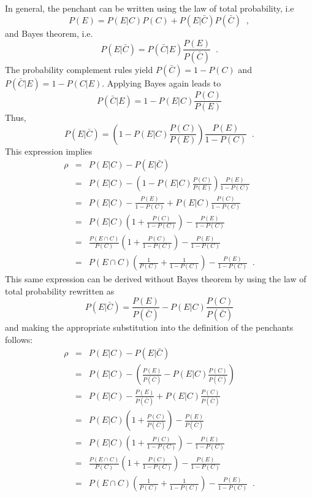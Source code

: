 \documentclass[a4paper,11pt]{article}
\begin{document}
In general, the penchant can be written using the law of total probability, i.e
$$
P(E) = P(E|C)P(C) + P(E|\bar{C})P(\bar{C})\;\;,
$$
and Bayes theorem, i.e.\ 
$$
P(E|\bar{C}) = P(\bar{C}|E)\frac{P(E)}{P(\bar{C})}\;\;.
$$
The probability complement rules yield $P(\bar{C}) = 1-P(C)$ and $P(\bar{C}|E) = 1-P(C|E)$.  Applying Bayes again leads to
$$
P(\bar{C}|E) = 1-P(E|C)\frac{P(C)}{P(E)}
$$
Thus,
$$
P(E|\bar{C}) = \left(1-P(E|C)\frac{P(C)}{P(E)}\right)\frac{P(E)}{1-P(C)}\;\;.
$$
This expression implies
\begin{eqnarray}
\rho &=& P(E|C)-P(E|\bar{C})\\
&=& P(E|C)-\left(1-P(E|C)\frac{P(C)}{P(E)}\right)\frac{P(E)}{1-P(C)}\\
&=& P(E|C)-\frac{P(E)}{1-P(C)}+P(E|C)\frac{P(C)}{1-P(C)}\\
&=& P(E|C)\left(1+\frac{P(C)}{1-P(C)}\right)-\frac{P(E)}{1-P(C)}\\
&=& \frac{P(E\cap C)}{P(C)}\left(1+\frac{P(C)}{1-P(C)}\right)-\frac{P(E)}{1-P(C)}\\
&=& P(E\cap C)\left(\frac{1}{P(C)}+\frac{1}{1-P(C)}\right)-\frac{P(E)}{1-P(C)}\;\;.
\end{eqnarray}
This same expression can be derived without Bayes theorem by using the law of total probability rewritten as
$$
P(E|\bar{C}) = \frac{P(E)}{P(\bar{C})} - P(E|C)\frac{P(C)}{P(\bar{C})}
$$
and making the appropriate substitution into the definition of the penchants follows:
\begin{eqnarray}
\rho &=& P(E|C)-P(E|\bar{C})\\
&=& P(E|C)-\left(\frac{P(E)}{P(\bar{C})} - P(E|C)\frac{P(C)}{P(\bar{C})}\right)\\
&=& P(E|C)-\frac{P(E)}{P(\bar{C})} + P(E|C)\frac{P(C)}{P(\bar{C})}\\
&=& P(E|C)\left(1+\frac{P(C)}{P(\bar{C})}\right)-\frac{P(E)}{P(\bar{C})}\\
&=& P(E|C)\left(1+\frac{P(C)}{1-P(C)}\right)-\frac{P(E)}{1-P(C)}\\
&=& \frac{P(E\cap C)}{P(C)}\left(1+\frac{P(C)}{1-P(C)}\right)-\frac{P(E)}{1-P(C)}\\
&=& P(E\cap C)\left(\frac{1}{P(C)}+\frac{1}{1-P(C)}\right)-\frac{P(E)}{1-P(C)}\;\;.
\end{eqnarray}
\end{document}
